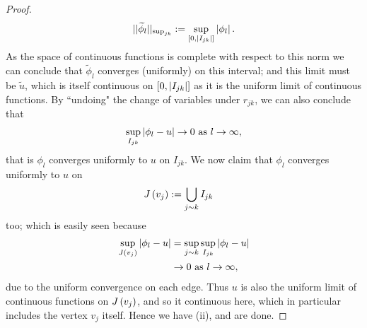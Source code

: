 \begin{proof}
	\begin{align*}
		\lvert\lvert \widetilde{\phi}_l \rvert\rvert_{\mathrm{sup}_{jk}} := \sup_{\left[ 0,\left\lvert I_{jk} \right\rvert \right]}\left\lvert \phi_l \right\rvert.
	\end{align*}
	As the space of continuous functions is complete with respect to this norm we can conclude that $\widetilde{\phi}_l$ converges (uniformly) on this interval; and this limit must be $\widetilde{u}$, which is itself continuous on $\left[ 0,\left\lvert I_{jk} \right\rvert \right]$ as it is the uniform limit of continuous functions.
	By ``undoing" the change of variables under $r_{jk}$, we can also conclude that
	\begin{align*}
		\sup_{I_{jk}}\left\lvert \phi_l - u \right\rvert\rightarrow0 \ \text{as} \ l \rightarrow\infty,
	\end{align*}
	that is $\phi_l$ converges uniformly to $u$ on $I_{jk}$.
	We now claim that $\phi_l$ converges uniformly to $u$ on
	\begin{align*}
		J\left( v_j \right) &:= \bigcup_{j\sim k}I_{jk}
	\end{align*}
	too; which is easily seen because
	\begin{align*}
		\sup_{J\left( v_j \right)}\left\lvert \phi_l - u \right\rvert &= \sup_{j\sim k}\sup_{I_{jk}}\left\lvert \phi_l - u \right\rvert \\
		&\rightarrow0 \ \text{as} \ l \rightarrow\infty,
	\end{align*}
	due to the uniform convergence on each edge.
	Thus $u$ is also the uniform limit of continuous functions on $J\left( v_j \right)$, and so it continuous here, which in particular includes the vertex $v_j$ itself.
	Hence we have (ii), and are done.
\end{proof}

